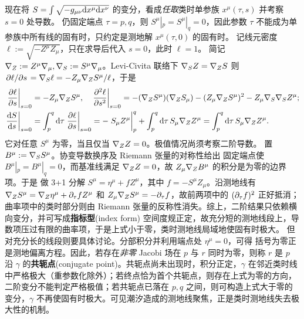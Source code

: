 现在将 $S=\int\sqrt{-g_{\mu\nu}\dd x^\mu\dd x^\nu}$ 的变分，看成\textit{任取}类时单参族 $x^\mu(\tau,s)$ 并考察 $s=0$ 处导数。
仍固定端点 $\tau=p,q$，则 $S^\mu|_p=S^\mu|_q=0$，因此参数 $\tau$ 不能成为单参族中所有线的固有时，只约定是测地解 $x^\mu(\tau,0)$ 的固有时。
记线元密度 $\ell:=\sqrt{-Z^\mu Z_\mu}$，只在求导后代入 $s=0$，此时 $\ell=1$。
简记 $\nabla_Z:=Z^\mu\nabla_\mu,\nabla_S:=S^\mu\nabla_\mu$。Levi-Civita 联络下 $\nabla_SZ=\nabla_ZS$ 则 $\pdv*{\ell}{s}=\nabla_S\ell=-Z_\mu\nabla_ZS^\mu/\ell$，于是
\begin{align*}
    \eval{\pdv{\ell}{s}}_{s=0}&=-Z_\mu\cd_ZS^\mu,\quad
    \eval{\pdv[2]{\ell}{s}}_{s=0}
    =-(\cd_ZS^\mu)(\cd_ZS_\mu)-(Z_\mu\cd_ZS^\mu)^2-Z_\mu\cd_S\cd_SZ^\mu;\\
    \eval{\dv{S}{s}}_{s=0} &= \int_p^q\d{\tau}\eval{\pdv{\ell}{s}}_{s=0} = -\eval{S_\mu Z^\mu}_p^q+\int_p^q\d\tau\,S_\mu \cd_Z Z^\mu=\int_p^q\d\tau\,S_\mu \cd_Z Z^\mu.
\end{align*}
它对任意 $S^\mu$ 为零，当且仅当 $\nabla_Z Z=0$。极值情况尚须考察二阶导数。
置 $B^\mu:=\nabla_SS^\mu$。协变导数换序及 Riemann 张量的对称性给出
固定端点使 $B^\mu|_p=B^\mu|_q=0$，而基准线满足 $\nabla_ZZ=0$，故 $Z_\mu\nabla_ZB^\mu$ 的积分是为零的边界项。于是
做 3+1 分解 $S^\mu=\eta^\mu+fZ^\mu$，其中 $f=-S^\mu Z_\mu$。沿测地线有 $\nabla_ZS^\mu=\nabla_Z\eta^\mu+\partial_\tau f Z^\mu$ 和 $Z_\mu\nabla_ZS^\mu=-\partial_\tau f$，故前两项中的 $(\partial_\tau f)^2$ 正好抵消；曲率项中的类时部分则由 Riemann 张量的反称性消失。综上，二阶结果只依赖横向变分，并可写成\textbf{指标型}(index form)
空间度规正定，故充分短的测地线段上，导数项压过有限的曲率项，于是上式小于零，类时测地线局域地使固有时极大。
但对充分长的线段则要具体讨论。分部积分并利用端点处 $\eta^\mu=0$，可得
括号为零正是测地偏离方程。因此，若存在\textit{非零} Jacobi 场在 $p$ 与 $r$ 同时为零，则称 $r$ 是 $p$ 沿 $\gamma$ 的\textbf{共轭点}(conjugate point)。共轭点尚未出现时，积分正定，$\gamma$ 在邻近类时线中严格极大（重参数化除外）；若终点恰为首个共轭点，则存在上式为零的方向，二阶变分不能判定严格极值；若共轭点已落在 $p,q$ 之间，则可构造上式大于零的变分，$\gamma$ 不再使固有时极大。可见潮汐造成的测地线聚焦，正是类时测地线失去极大性的机制。

